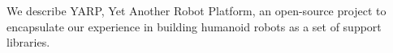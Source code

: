 
We describe YARP, Yet Another Robot Platform, an open-source project
to encapsulate our experience in building humanoid robots as a set of
support libraries.

